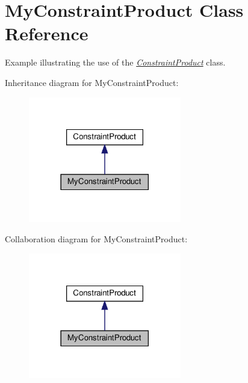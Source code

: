 \hypertarget{class_my_constraint_product}{}\section{My\+Constraint\+Product Class Reference}
\label{class_my_constraint_product}


Example illustrating the use of the {\itshape \hyperlink{class_constraint_product}{Constraint\+Product}} class.  




Inheritance diagram for My\+Constraint\+Product\+:
\nopagebreak
\begin{figure}[H]
\begin{center}
\leavevmode
\includegraphics[width=189pt]{class_my_constraint_product__inherit__graph}
\end{center}
\end{figure}


Collaboration diagram for My\+Constraint\+Product\+:
\nopagebreak
\begin{figure}[H]
\begin{center}
\leavevmode
\includegraphics[width=189pt]{class_my_constraint_product__coll__graph}
\end{center}
\end{figure}
